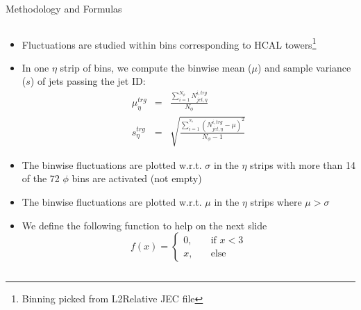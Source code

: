 \documentclass[9pt]{beamer}
\begin{document}
\begin{frame}[t]{Methodology and Formulas}
\begin{columns}[T]
\begin{column}{\textwidth}
\begin{itemize}
 \item Fluctuations are studied within bins corresponding to HCAL towers\footnote{Binning picked from L2Relative JEC file}
 \item In one $\eta$ strip of bins, we compute the binwise mean ($\mu$) and sample variance ($s$) of jets passing the jet ID:
 \begin{eqnarray}
     \mu_{\eta}^{trg} &=& \frac{\sum_{i=1}^{N_\phi} N_{jet,\eta}^{i,trg}}{N_\phi} \\
     s_{\eta}^{trg} &=& \sqrt{\frac{\sum_{i=1}^{^{N_\phi}}\left(N_{jet,\eta}^{i,trg}-\mu\right)^2}{N_\phi-1}}
 \end{eqnarray}
 \item The binwise fluctuations are plotted w.r.t. $\sigma$ in the $\eta$ strips with more than 14 of the 72 $\phi$ bins are activated (not empty)
 \item The binwise fluctuations are plotted w.r.t. $\mu$ in the $\eta$ strips where $\mu > \sigma$
 \item We define the following function to help on the next slide
     \begin{equation}
     f(x) =
  \begin{cases}
    0, &\quad\text{if } x < 3\\
    x, &\quad\text{else}
  \end{cases}
 \end{equation}
\end{itemize}
\end{column}
\end{columns}
\end{frame}
\end{document}
